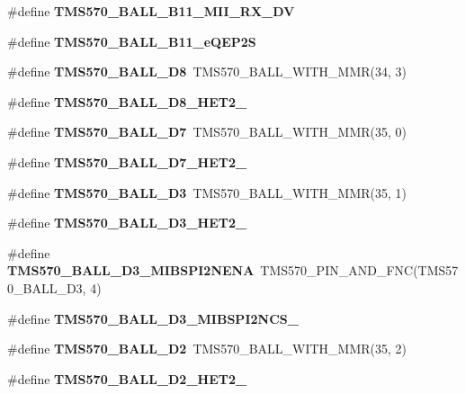 \begin{DoxyCompactItemize}
\item 
\#define {\bfseries T\+M\+S570\+\_\+\+B\+A\+L\+L\+\_\+\+B11\+\_\+\+M\+I\+I\+\_\+\+R\+X\+\_\+\+DV}
\item 
\#define {\bfseries T\+M\+S570\+\_\+\+B\+A\+L\+L\+\_\+\+B11\+\_\+e\+Q\+E\+P2S}
\item 
\mbox{\label{tms570lc4357-pins_8h_a98eb3e9d342cd149cdfa4bbbd458d07c}} 
\#define {\bfseries T\+M\+S570\+\_\+\+B\+A\+L\+L\+\_\+\+D8}~T\+M\+S570\+\_\+\+B\+A\+L\+L\+\_\+\+W\+I\+T\+H\+\_\+\+M\+MR(34, 3)
\item 
\#define {\bfseries T\+M\+S570\+\_\+\+B\+A\+L\+L\+\_\+\+D8\+\_\+\+H\+E\+T2\+\_}
\item 
\mbox{\label{tms570lc4357-pins_8h_a551afa2d026be437a3480219ec822d3d}} 
\#define {\bfseries T\+M\+S570\+\_\+\+B\+A\+L\+L\+\_\+\+D7}~T\+M\+S570\+\_\+\+B\+A\+L\+L\+\_\+\+W\+I\+T\+H\+\_\+\+M\+MR(35, 0)
\item 
\#define {\bfseries T\+M\+S570\+\_\+\+B\+A\+L\+L\+\_\+\+D7\+\_\+\+H\+E\+T2\+\_}
\item 
\mbox{\label{tms570lc4357-pins_8h_a0ce6292928d4dd3acb16ba63ff656bc6}} 
\#define {\bfseries T\+M\+S570\+\_\+\+B\+A\+L\+L\+\_\+\+D3}~T\+M\+S570\+\_\+\+B\+A\+L\+L\+\_\+\+W\+I\+T\+H\+\_\+\+M\+MR(35, 1)
\item 
\#define {\bfseries T\+M\+S570\+\_\+\+B\+A\+L\+L\+\_\+\+D3\+\_\+\+H\+E\+T2\+\_}
\item 
\mbox{\label{tms570lc4357-pins_8h_af66e3ac48a97e7ad860614611cf31514}} 
\#define {\bfseries T\+M\+S570\+\_\+\+B\+A\+L\+L\+\_\+\+D3\+\_\+\+M\+I\+B\+S\+P\+I2\+N\+E\+NA}~T\+M\+S570\+\_\+\+P\+I\+N\+\_\+\+A\+N\+D\+\_\+\+F\+NC(T\+M\+S570\+\_\+\+B\+A\+L\+L\+\_\+\+D3, 4)
\item 
\#define {\bfseries T\+M\+S570\+\_\+\+B\+A\+L\+L\+\_\+\+D3\+\_\+\+M\+I\+B\+S\+P\+I2\+N\+C\+S\+\_}
\item 
\mbox{\label{tms570lc4357-pins_8h_a2fb32eecced39ce72cbc662be0a39cc6}} 
\#define {\bfseries T\+M\+S570\+\_\+\+B\+A\+L\+L\+\_\+\+D2}~T\+M\+S570\+\_\+\+B\+A\+L\+L\+\_\+\+W\+I\+T\+H\+\_\+\+M\+MR(35, 2)
\item 
\#define {\bfseries T\+M\+S570\+\_\+\+B\+A\+L\+L\+\_\+\+D2\+\_\+\+H\+E\+T2\+\_}
\item 

\end{DoxyCompactItemize}
